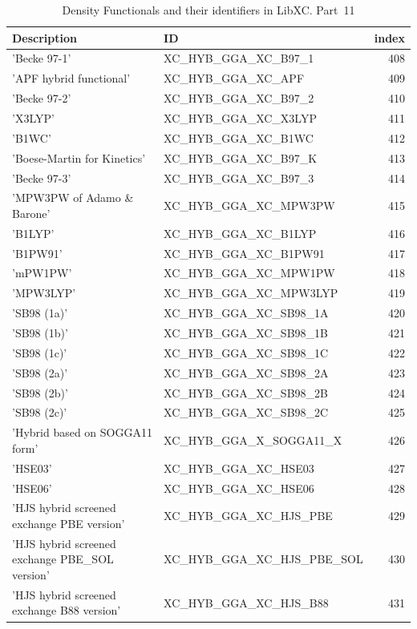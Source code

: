 \documentclass[final,12pt,makeidx,DIV=calc]{article}
\begin{document}
{{{{{{\begin{table}[!h]
\caption{Density Functionals and their identifiers in LibXC. Part~11}
\begin{center}
\begin{tabular}{llr}
\hline
\hline
Description & ID & index\\
\hline
  'Becke 97-1' & XC\_HYB\_GGA\_XC\_B97\_1  &408\\
  'APF hybrid functional' & XC\_HYB\_GGA\_XC\_APF  &409\\
  'Becke 97-2' & XC\_HYB\_GGA\_XC\_B97\_2  &410\\
  'X3LYP' & XC\_HYB\_GGA\_XC\_X3LYP  &411\\
  'B1WC' & XC\_HYB\_GGA\_XC\_B1WC  &412\\
  'Boese-Martin for Kinetics' & XC\_HYB\_GGA\_XC\_B97\_K  &413\\
  'Becke 97-3' & XC\_HYB\_GGA\_XC\_B97\_3  &414\\
  'MPW3PW of Adamo \& Barone' & XC\_HYB\_GGA\_XC\_MPW3PW  &415\\
  'B1LYP' & XC\_HYB\_GGA\_XC\_B1LYP  &416\\
  'B1PW91' & XC\_HYB\_GGA\_XC\_B1PW91  &417\\
  'mPW1PW' & XC\_HYB\_GGA\_XC\_MPW1PW  &418\\
  'MPW3LYP' & XC\_HYB\_GGA\_XC\_MPW3LYP  &419\\
  'SB98 (1a)' & XC\_HYB\_GGA\_XC\_SB98\_1A  &420\\
  'SB98 (1b)' & XC\_HYB\_GGA\_XC\_SB98\_1B  &421\\
  'SB98 (1c)' & XC\_HYB\_GGA\_XC\_SB98\_1C  &422\\
  'SB98 (2a)' & XC\_HYB\_GGA\_XC\_SB98\_2A  &423\\
  'SB98 (2b)' & XC\_HYB\_GGA\_XC\_SB98\_2B  &424\\
  'SB98 (2c)' & XC\_HYB\_GGA\_XC\_SB98\_2C  &425\\
  'Hybrid based on SOGGA11 form' & XC\_HYB\_GGA\_X\_SOGGA11\_X  &426\\
  'HSE03' & XC\_HYB\_GGA\_XC\_HSE03  &427\\
  'HSE06' & XC\_HYB\_GGA\_XC\_HSE06  &428\\
  'HJS hybrid screened exchange PBE version' & XC\_HYB\_GGA\_XC\_HJS\_PBE  &429\\
  'HJS hybrid screened exchange PBE\_SOL version' & XC\_HYB\_GGA\_XC\_HJS\_PBE\_SOL  &430\\
  'HJS hybrid screened exchange B88 version' & XC\_HYB\_GGA\_XC\_HJS\_B88  &431\\

\end{tabular}
\end{center}
\end{table}}}}}}}
\end{document}
